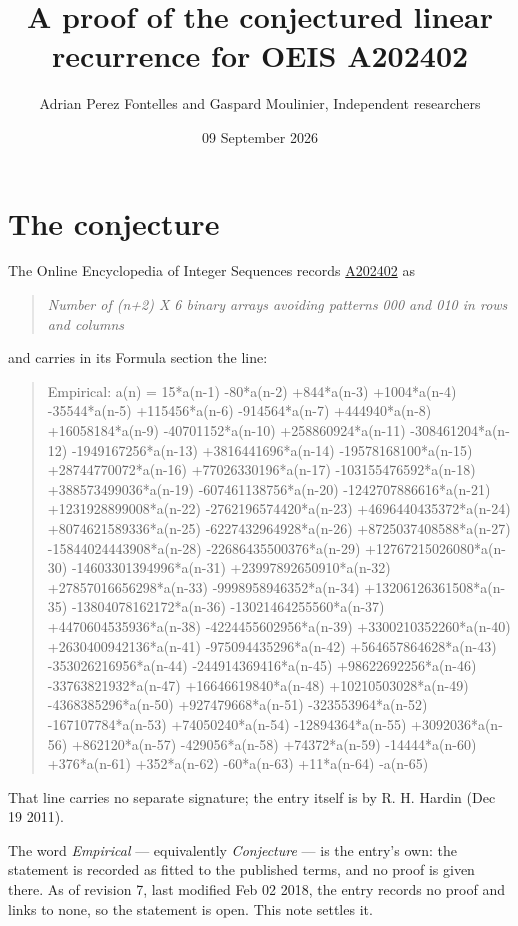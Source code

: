 \documentclass[11pt]{article}
\title{A proof of the conjectured linear recurrence for OEIS A202402}
\author{Adrian Perez Fontelles and Gaspard Moulinier, Independent researchers}
\date{09 September 2026}
\theoremstyle{definition}
\begin{document}
\maketitle
\section{The conjecture}

The Online Encyclopedia of Integer Sequences records \href{https://oeis.org/A202402}{A202402} as

\begin{quote}\itshape Number of (n+2) X 6 binary arrays avoiding patterns 000 and 010 in rows and columns\end{quote}

and carries in its Formula section the line:

\begin{quote}\ttfamily Empirical: a(n) = 15*a(n-1) -80*a(n-2) +844*a(n-3) +1004*a(n-4) -35544*a(n-5) +115456*a(n-6) -914564*a(n-7) +444940*a(n-8) +16058184*a(n-9) -40701152*a(n-10) +258860924*a(n-11) -308461204*a(n-12) -1949167256*a(n-13) +3816441696*a(n-14) -19578168100*a(n-15) +28744770072*a(n-16) +77026330196*a(n-17) -103155476592*a(n-18) +388573499036*a(n-19) -607461138756*a(n-20) -1242707886616*a(n-21) +1231928899008*a(n-22) -2762196574420*a(n-23) +4696440435372*a(n-24) +8074621589336*a(n-25) -6227432964928*a(n-26) +8725037408588*a(n-27) -15844024443908*a(n-28) -22686435500376*a(n-29) +12767215026080*a(n-30) -14603301394996*a(n-31) +23997892650910*a(n-32) +27857016656298*a(n-33) -9998958946352*a(n-34) +13206126361508*a(n-35) -13804078162172*a(n-36) -13021464255560*a(n-37) +4470604535936*a(n-38) -4224455602956*a(n-39) +3300210352260*a(n-40) +2630400942136*a(n-41) -975094435296*a(n-42) +564657864628*a(n-43) -353026216956*a(n-44) -244914369416*a(n-45) +98622692256*a(n-46) -33763821932*a(n-47) +16646619840*a(n-48) +10210503028*a(n-49) -4368385296*a(n-50) +927479668*a(n-51) -323553964*a(n-52) -167107784*a(n-53) +74050240*a(n-54) -12894364*a(n-55) +3092036*a(n-56) +862120*a(n-57) -429056*a(n-58) +74372*a(n-59) -14444*a(n-60) +376*a(n-61) +352*a(n-62) -60*a(n-63) +11*a(n-64) -a(n-65)\end{quote}

That line carries no separate signature; the entry itself is by R. H. Hardin (Dec 19 2011).

The word {\itshape Empirical} --- equivalently {\itshape Conjecture} --- is the entry's own: the statement is recorded as fitted to the published terms, and no proof is given there. As of revision 7, last modified Feb 02 2018, the entry records no proof and links to none, so the statement is open. This note settles it.
\end{document}
